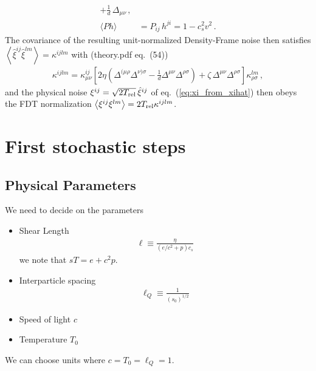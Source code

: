 \documentclass[12pt,aps,preprint,nofootinbib,noshowkeys,noshowpacs,longbibliography,superscriptaddress,tightenlines]{revtex4-2}
\def\llangle{\left\langle}
\def\rrangle{\right\rangle}
\def\Eq#1{eq.~(\ref{#1})}
\begin{document}
\begin{enumerate}
\begin{align}
      + \frac{1}{d}\,\Delta_{\mu\nu} \,, \\
  \langle Ph\rangle &= P_{ij}\,h^{ji} = 1 - c_s^2 v^2 \,.
\end{align}
The covariance of the resulting unit-normalized Density-Frame noise then
satisfies $\llangle\hat\xi^{ij}\hat\xi^{lm}\rrangle = \kappa^{ijlm}$ with
(theory.pdf eq.\ (54))
\begin{align}
  \kappa^{ijlm} = \kappa^{ij}_{\mu\nu}
    \left[2\eta\!\left(\Delta^{(\mu\rho}\Delta^{\nu)\sigma}
      - \tfrac{1}{d}\Delta^{\mu\nu}\Delta^{\rho\sigma}\right)
      + \zeta\,\Delta^{\mu\nu}\Delta^{\rho\sigma}\right]
    \kappa^{lm}_{\rho\sigma} \,,
\end{align}
and the physical noise $\xi^{ij} = \sqrt{2T_{\rm rel}}\,\hat\xi^{ij}$ of
\Eq{eq:xi_from_xihat} then obeys the FDT normalization
$\llangle\xi^{ij}\xi^{lm}\rrangle = 2 T_{\rm rel}\kappa^{ijlm}$.

\end{enumerate}

\section{First stochastic steps}

\subsection{Physical Parameters}
We need to decide on the parameters
\begin{itemize}
\item Shear Length
\begin{align}
 \ell  \equiv  \frac{\eta }{(e/c^2 +  p) c_s}
\end{align}
we note that $sT = e + c^2 p$. 
\item Interparticle spacing 
\begin{align}
 \ell_Q  \equiv  \frac{1}{(s_0)^{1/2}}
\end{align}
\item  Speed of light $c$

\item  Temperature $T_0$
\end{itemize}

We can choose units where $c = T_0 = \ell_Q = 1$.  
\end{document}
